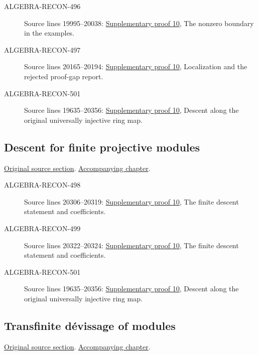 \begin{description}
\item[ALGEBRA-RECON-496] Source lines 19995--20038: \hyperlink{algebra_open_loci_pure_descent_notes_20260927}{Supplementary proof 10}, The nonzero boundary in the examples.
\item[ALGEBRA-RECON-497] Source lines 20165--20194: \hyperlink{algebra_open_loci_pure_descent_notes_20260927}{Supplementary proof 10}, Localization and the rejected proof-gap report.
\item[ALGEBRA-RECON-501] Source lines 19635--20356: \hyperlink{algebra_open_loci_pure_descent_notes_20260927}{Supplementary proof 10}, Descent along the original universally injective ring map.
\end{description}

\subsection{Descent for finite projective modules}
\hypertarget{algebra-source-section-finite-projective}{}
\noindent\href{https://github.com/stacks/stacks-project/blob/a04446e57ec1fbc252a871afcec7752fb2807b14/algebra.tex\#L20274}{Original source section}. \href{algebra.pdf\#nameddest=section-finite-projective}{Accompanying chapter}.

\begin{description}
\item[ALGEBRA-RECON-498] Source lines 20306--20319: \hyperlink{algebra_open_loci_pure_descent_notes_20260927}{Supplementary proof 10}, The finite descent statement and coefficients.
\item[ALGEBRA-RECON-499] Source lines 20322--20324: \hyperlink{algebra_open_loci_pure_descent_notes_20260927}{Supplementary proof 10}, The finite descent statement and coefficients.
\item[ALGEBRA-RECON-501] Source lines 19635--20356: \hyperlink{algebra_open_loci_pure_descent_notes_20260927}{Supplementary proof 10}, Descent along the original universally injective ring map.
\end{description}

\subsection{Transfinite d\'evissage of modules}
\hypertarget{algebra-source-section-transfinite-devissage}{}
\noindent\href{https://github.com/stacks/stacks-project/blob/a04446e57ec1fbc252a871afcec7752fb2807b14/algebra.tex\#L20374}{Original source section}. \href{algebra.pdf\#nameddest=section-transfinite-devissage}{Accompanying chapter}.

